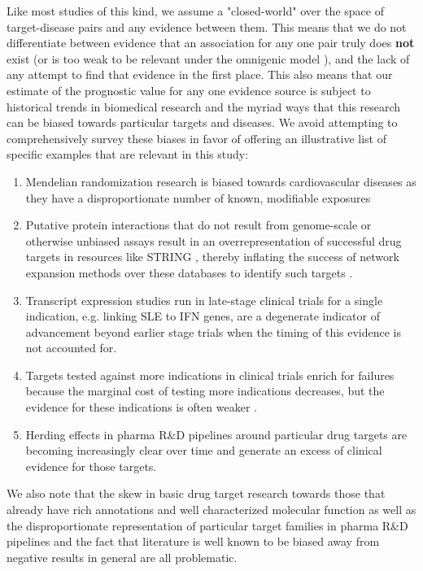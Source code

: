 \documentclass{article}
\begin{document}
Like most studies of this kind, we assume a "closed-world" \cite{Paliwal2020-hr} over the space of target-disease pairs and any evidence between them. This means that we do not differentiate between evidence that an association for any one pair truly does \textbf{not} exist (or is too weak to be relevant under the omnigenic model \cite{PMID:28622505}), and the lack of any attempt to find that evidence in the first place. This also means that our estimate of the prognostic value for any one evidence source is subject to historical trends in biomedical research and the myriad ways that this research can be biased towards particular targets and diseases. We avoid attempting to comprehensively survey these biases in favor of offering an illustrative list of specific examples that are relevant in this study:

\begin{enumerate}
\item Mendelian randomization research is biased towards cardiovascular diseases as they have a disproportionate number of known, modifiable exposures \cite{PMID:36736292}
\item Putative protein interactions that do not result from genome-scale or otherwise unbiased assays result in an overrepresentation of successful drug targets in resources like STRING \cite{PMID:36370105}, thereby inflating the success of network expansion methods over these databases to identify such targets \cite{Sadler2023-xd}.
\item Transcript expression studies run in late-stage clinical trials for a single indication, e.g. \cite{PMID:27723281} linking SLE to IFN genes, are a degenerate indicator of advancement beyond earlier stage trials when the timing of this evidence is not accounted for.
\item Targets tested against more indications in clinical trials enrich for failures because the marginal cost of testing more indications decreases, but the evidence for these indications is often weaker \cite{PMID:33262371}.
\item Herding effects in pharma R\&D pipelines around particular drug targets are becoming increasingly clear over time \cite{PMID:37117303} and generate an excess of clinical evidence for those targets.
\end{enumerate}

We also note that the skew in basic drug target research towards those that already have rich annotations and well characterized molecular function \cite{PMID:29358745} as well as the disproportionate representation of particular target families in pharma R\&D pipelines \cite{PMID:27910877,PPR:PPR7029} and the fact that literature is well known to be biased away from negative results in general \cite{PMID:32893970} are all problematic. 
\end{document}
